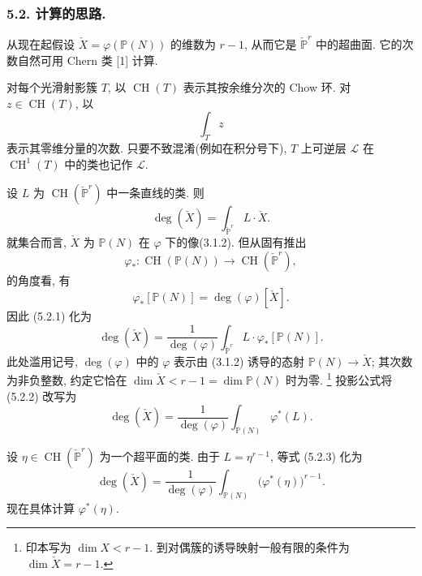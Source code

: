 \subsubsection*{5.2. 计算的思路.}

从现在起假设 $\check X=\varphi(\mathbb P(N))$ 的维数为 $r-1$, 从而它是 $\check{\mathbb P}^{r}$ 中的超曲面. 它的次数自然可用 Chern 类 [1] 计算.

对每个光滑射影簇 $T$, 以 $\operatorname{CH}(T)$ 表示其按余维分次的 Chow 环. 对 $z\in\operatorname{CH}(T)$, 以
\[
\int_T z
\]
表示其零维分量的次数. 只要不致混淆(例如在积分号下), $T$ 上可逆层 $\mathcal L$ 在 $\operatorname{CH}^1(T)$ 中的类也记作 $\mathcal L$.

设 $L$ 为 $\operatorname{CH}(\check{\mathbb P}^{r})$ 中一条直线的类. 则
\begin{equation}\tag{5.2.1}
\deg(\check X)
=\int_{\check{\mathbb P}^{r}}L\cdot\check X.
\end{equation}
就集合而言, $\check X$ 为 $\mathbb P(N)$ 在 $\varphi$ 下的像(3.1.2). 但从固有推出
\[
\varphi_*:\operatorname{CH}(\mathbb P(N))
\longrightarrow\operatorname{CH}(\check{\mathbb P}^{r}),
\]
的角度看, 有
\[
\varphi_*[\mathbb P(N)]=\deg(\varphi)[\check X].
\]
因此 (5.2.1) 化为
\begin{equation}\tag{5.2.2}
\deg(\check X)
=\frac{1}{\deg(\varphi)}
\int_{\check{\mathbb P}^{r}}L\cdot\varphi_*[\mathbb P(N)].
\end{equation}
此处滥用记号, $\deg(\varphi)$ 中的 $\varphi$ 表示由 (3.1.2) 诱导的态射 $\mathbb P(N)\to\check X$; 其次数为非负整数, 约定它恰在 $\dim\check X<r-1=\dim\mathbb P(N)$ 时为零.
\footnote{印本写为 $\dim X<r-1$. 到对偶簇的诱导映射一般有限的条件为 $\dim\check X=r-1$.}
投影公式将 (5.2.2) 改写为
\begin{equation}\tag{5.2.3}
\deg(\check X)
=\frac{1}{\deg(\varphi)}
\int_{\mathbb P(N)}\varphi^*(L).
\end{equation}

设 $\eta\in\operatorname{CH}(\check{\mathbb P}^{r})$ 为一个超平面的类. 由于 $L=\eta^{r-1}$, 等式 (5.2.3) 化为
\begin{equation}\tag{5.2.4}
\deg(\check X)
=\frac{1}{\deg(\varphi)}
\int_{\mathbb P(N)}\bigl(\varphi^*(\eta)\bigr)^{r-1}.
\end{equation}
现在具体计算 $\varphi^*(\eta)$.

